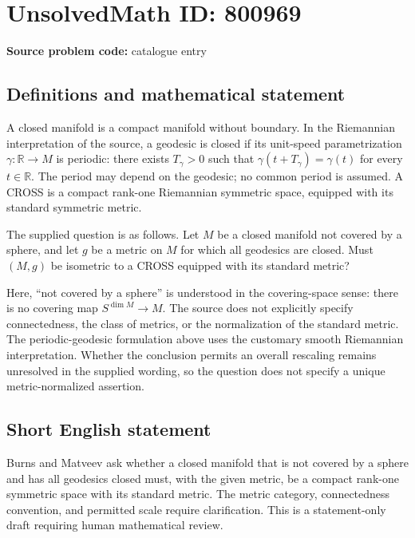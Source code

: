 \documentclass[11pt]{article}
\newcommand{\R}{\mathbb{R}}
\begin{document}
\section*{UnsolvedMath ID: 800969}
\textbf{Source problem code:} catalogue entry
\subsection{Definitions and mathematical statement}
A closed manifold is a compact manifold without boundary. In the Riemannian interpretation of the source, a geodesic is closed if its unit-speed parametrization \(\gamma:\R\to M\) is periodic: there exists \(T_\gamma>0\) such that \(\gamma(t+T_\gamma)=\gamma(t)\) for every \(t\in\R\). The period may depend on the geodesic; no common period is assumed. A CROSS is a compact rank-one Riemannian symmetric space, equipped with its standard symmetric metric.

The supplied question is as follows. Let \(M\) be a closed manifold not covered by a sphere, and let \(g\) be a metric on \(M\) for which all geodesics are closed. Must \((M,g)\) be isometric to a CROSS equipped with its standard metric?

Here, ``not covered by a sphere'' is understood in the covering-space sense: there is no covering map \(S^{\dim M}\to M\). The source does not explicitly specify connectedness, the class of metrics, or the normalization of the standard metric. The periodic-geodesic formulation above uses the customary smooth Riemannian interpretation. Whether the conclusion permits an overall rescaling remains unresolved in the supplied wording, so the question does not specify a unique metric-normalized assertion.
\subsection{Short English statement}
Burns and Matveev ask whether a closed manifold that is not covered by a sphere and has all geodesics closed must, with the given metric, be a compact rank-one symmetric space with its standard metric. The metric category, connectedness convention, and permitted scale require clarification. This is a statement-only draft requiring human mathematical review.
\end{document}
